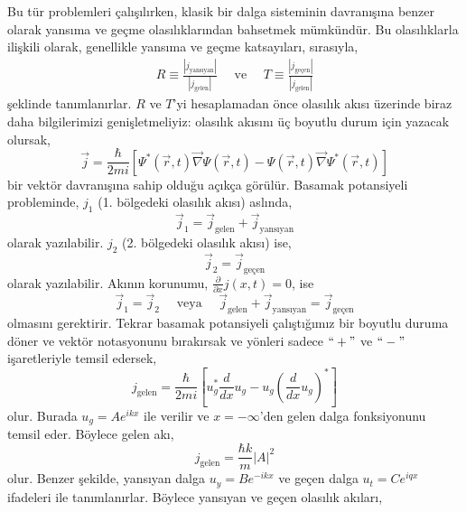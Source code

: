 \documentclass[00_kitap.tex]{subfiles}
\begin{document}
Bu tür problemleri çalışılırken, klasik bir dalga sisteminin davranışına benzer olarak yansıma ve geçme olasılıklarından bahsetmek mümkündür. Bu olasılıklarla ilişkili olarak, genellikle yansıma ve geçme katsayıları, sırasıyla,
\begin{align}
R \equiv \frac{|j_\text{yansıyan}|}{|j_\text{gelen}|} \quad \text{ ve } \quad
T \equiv \frac{|j_\text{geçen}|}{|j_\text{gelen}|}
\end{align}
şeklinde tanımlanırlar. $R$ ve $T$'yi hesaplamadan önce olasılık akısı üzerinde biraz daha bilgilerimizi genişletmeliyiz: olasılık akısını üç boyutlu durum için yazacak olursak,
\begin{equation}
\vec j = \frac{\hbar}{2 m i} \left[
\Psi^*(\vec r, t) \vec \nabla \Psi(\vec r, t) - 
\Psi(\vec r, t) \vec \nabla \Psi^*(\vec r, t)
\right]
\end{equation}
bir vektör davranışına sahip olduğu açıkça görülür. Basamak potansiyeli probleminde, $j_1$ (1. bölgedeki olasılık akısı) aslında,
\begin{equation}
\vec j_1 = \vec j_\text{gelen} + \vec j_\text{yansıyan}
\end{equation}
olarak yazılabilir. $j_2$  (2. bölgedeki olasılık akısı) ise,
\begin{equation}
\vec j_2 = \vec j_\text{geçen}
\end{equation}
olarak yazılabilir. Akının korunumu, $\frac { \partial } { \partial x } j ( x , t ) = 0$, ise
\begin{equation}
\vec j_1 = \vec j_2 \quad \text{ veya } \quad \vec j_\text{gelen} + \vec j_\text{yansıyan} = \vec j_\text{geçen}
\end{equation}
olmasını gerektirir. Tekrar basamak potansiyeli çalıştığımız bir boyutlu duruma döner ve vektör notasyonunu bırakırsak ve yönleri sadece $``+"$ ve $``-"$  işaretleriyle temsil edersek,
\begin{equation}
j_\text{gelen} =  \frac{\hbar}{2 m i} \left[u^*_g \frac{d}{dx}u_g - u_g (\frac{d}{dx}u_g)^*\right]
\end{equation}
olur. Burada $u_g = A e ^ { i k x } $ ile verilir ve $x=-\infty$'den gelen dalga fonksiyonunu temsil eder. Böylece gelen akı,
\begin{equation}
j_\text{gelen} =  \frac{\hbar k}{m} |A|^2
\end{equation}
olur. Benzer şekilde, yansıyan dalga $u_y = B e ^ { -i k x } $ ve geçen dalga $u_t = C e ^ { i q x } $ ifadeleri ile tanımlanırlar. Böylece yansıyan ve geçen olasılık akıları,
\end{document}
